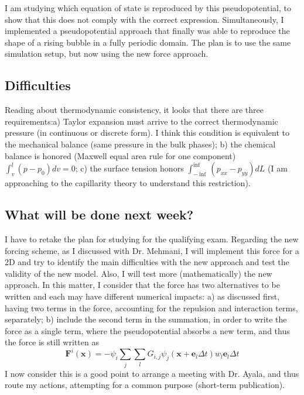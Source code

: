 \documentclass[12pt]{article}
\begin{document}
	I am studying which equation of state is reproduced by this pseudopotential, to show that this does not comply with the correct expression. Simultaneously, I implemented a pseudopotential approach that finally was able to reproduce the shape of a rising bubble in a fully periodic domain. The plan is to use the same simulation setup, but now using the new force approach.

	\subsection*{Difficulties}
	Reading about thermodynamic consistency, it looks that there are three requirements:a) Taylor expansion must arrive to the correct thermodynamic pressure (in continuous or discrete form). I think this condition is equivalent to the mechanical balance (same pressure in the bulk phases); b) the chemical balance is honored (Maxwell equal area rule for one component) $\int_v^l (p - p_0)d v = 0$; c) the surface tension honors $\int^{\inf}_{-\inf} (p_{xx}-p_{yy}) dL$ (I am approaching to the capillarity theory to understand this restriction).
	
	
	\subsection*{What will be done next week?}
	I have to retake the plan for studying for the qualifying exam. Regarding the new forcing scheme, as I discussed with Dr. Mehmani, I will implement this force for a 2D and try to identify the main difficulties with the new approach and test the validity of the new model. Also, I will test more (mathematically)  the new approach. In this matter, I consider that the force has two alternatives to be written and each may have different numerical impacts: a) as discussed first, having two terms in the force, accounting for the repulsion and interaction terms, separately; b) include the second term in the summation, in order to write the force as a single term, where the pseudopotential absorbs a new term, and thus the force is still written as 
	\begin{equation*}
		\mathbf{F}^i (\mathbf{x}) = - \psi_i \sum_j \sum_l G_{i,j} \psi_j (\mathbf{x} + \mathbf{e}_l \Delta t) w_l \mathbf{e}_l \Delta t
	\end{equation*}
	I now consider this is a good point to arrange a meeting with Dr. Ayala, and thus route my actions, attempting for a common purpose (short-term publication). 
	
	\pagebreak
\end{document}
